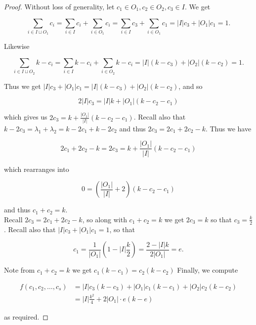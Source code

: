 \documentclass[10pt,a4paper]{amsart}
\begin{document}
\begin{proof}
Without loss of generality, let $c_1 \in O_1, c_2 \in O_2, c_3 \in I$. We get 

$$\sum_{i \in I \sqcup O_1} c_i = \sum_{i \in I} c_i + \sum_{i \in O_1} c_i = \sum_{i \in I} c_3 + \sum_{i \in O_1} c_1 = |I|c_3 + |O_1|c_1 = 1.$$

\noindent
Likewise

$$\sum_{i \in I \sqcup O_2} k-c_i = \sum_{i \in I}k- c_i + \sum_{i \in O_2}k- c_i = |I|(k-c_3) + |O_2|(k-c_2) = 1.$$

\noindent
Thus we get $|I|c_3 + |O_1|c_1 =|I|(k-c_3) + |O_2|(k-c_2)$, and so 

$$2|I|c_3 = |I|k+|O_1|(k-c_2-c_1)$$

\noindent
which gives us $2c_3 = k+ \frac{|O_1|}{|I|}(k-c_2-c_1)$. Recall also that $k-2c_3 = \lambda_1 + \lambda_2 = k-2c_1+k-2c_2 $ and thus $2c_3 = 2c_1+2c_2-k$. Thus we have 

$$2c_1+2c_2-k = 2c_3 = k+\frac{|O_1|}{|I|}(k-c_2-c_1)$$

\noindent
which rearranges into

$$0 = (\frac{|O_1|}{|I|} + 2)(k-c_2-c_1)$$

\noindent
and thus $c_1+c_2 = k$. \\

Recall $2c_3 = 2c_1+2c_2 - k$, so along with $c_1+c_2 = k$ we get $2c_3 = k$ so that $c_3 = \frac{k}{2}$. Recall also that $|I|c_3 + |O_1|c_1 = 1$, so that 

$$c_1 = \frac{1}{|O_1|}(1-|I|\frac{k}{2}) = \frac{2-|I|k}{2|O_1|} = e.$$

\noindent
Note from $c_1+c_2 = k$ we get $c_1(k-c_1) = c_2(k-c_2)$ Finally, we compute

\begin{align*}
f(c_1,c_2,\ldots,c_s) &= |I|c_3(k-c_3) + |O_1|c_1(k-c_1)+|O_2|c_2(k-c_2) \\
&= |I|\frac{k^2}{4} + 2|O_1| \cdot e(k-e) 
\end{align*}

\noindent
as required.
\end{proof}
\end{document}
